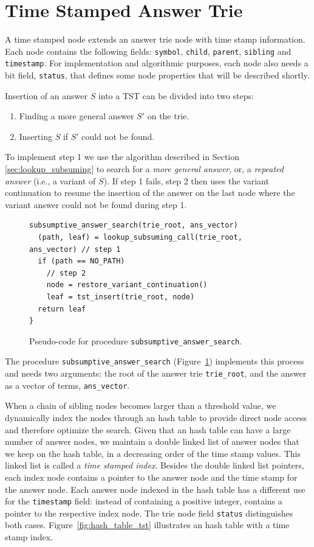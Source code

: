 \section{Time Stamped Answer Trie}

A time stamped node extends an answer trie node with time stamp information.
Each node contains the following fields: \texttt{symbol}, \texttt{child}, \texttt{parent}, \texttt{sibling}
and \texttt{timestamp}. For implementation and algorithmic purposes, each node also needs a bit field,
\texttt{status}, that defines some node properties that will be described shortly.

Insertion of an answer $S$ into a TST can be divided into two steps:

\begin{enumerate}
  \item Finding a more general answer $S'$ on the trie.
  \item Inserting $S$ if $S'$ could not be found.
\end{enumerate}

To implement step 1 we use the algorithm described in Section \ref{sec:lookup_subsuming}
to search for a \textit{more general answer}, or, a \textit{repeated answer} (i.e., a variant of $S$).
If step 1 fails, step 2 then uses the variant continuation to resume the insertion of the answer
on the last node where the variant answer could not be found during step 1.

\begin{figure}[ht]
\begin{Verbatim}
subsumptive_answer_search(trie_root, ans_vector)
  (path, leaf) = lookup_subsuming_call(trie_root, ans_vector) // step 1
  if (path == NO_PATH)
    // step 2
    node = restore_variant_continuation()
    leaf = tst_insert(trie_root, node)
  return leaf
}
\end{Verbatim}
\caption{Pseudo-code for procedure \texttt{subsumptive\_answer\_search}.}
\label{fig:subsumptive_answer_search}
\end{figure}

The procedure \texttt{subsumptive\_answer\_search} (Figure~\ref{fig:subsumptive_answer_search})
implements this process and needs two arguments: the root of the answer trie \texttt{trie\_root}, and
the answer as a vector of terms, \texttt{ans\_vector}.

When a chain of sibling nodes becomes larger than a threshold value, we dynamically index the nodes through an hash table to provide direct node access and therefore optimize the search. Given that an hash table
can have a large number of answer nodes, we maintain a double linked list of answer nodes that we keep on the hash
table, in a decreasing order of the time stamp values. This linked list is called a \textit{time stamped index}.
Besides the double linked list pointers, each index node contains a pointer to the answer node
and the time stamp for the answer node. Each answer node indexed in the hash table has a different use
for the \texttt{timestamp} field: instead of containing a positive integer, contains a pointer
to the respective index node. The trie node field \texttt{status} distinguishes
both cases. Figure~\ref{fig:hash_table_tst} illustrates an hash table with a time stamp index.

